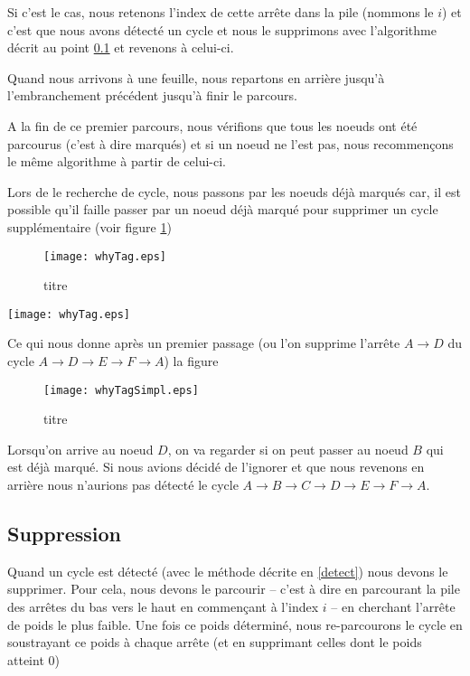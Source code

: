 \documentclass[12pt, oneside]{article}
\begin{document}
Si c'est le cas, nous retenons l'index de cette arrête dans la pile (nommons le $i$) et c'est que nous avons détecté un cycle et nous le supprimons avec l'algorithme décrit au point \ref{del} et revenons à celui-ci.

Quand nous arrivons à une feuille, nous repartons en arrière jusqu'à l'embranchement précédent jusqu'à finir le parcours.

A la fin de ce premier parcours, nous vérifions que tous les noeuds ont été parcourus (c'est à dire marqués) et si un noeud ne l'est pas, nous recommençons le même algorithme à partir de celui-ci.

Lors de le recherche de cycle, nous passons par les noeuds déjà marqués car, il est possible qu'il faille passer par un noeud déjà marqué pour supprimer un cycle supplémentaire (voir figure \ref{whyTag})

\begin{figure}[h]
   \caption{\label{whyTag} titre}
   \begin{center}
   \texttt{[image: whyTag.eps]}
   \end{center}
\end{figure}
\texttt{[image: whyTag.eps]}

Ce qui nous donne après un premier passage (ou l'on supprime l'arrête $A \rightarrow D$ du cycle $A \rightarrow D \rightarrow E \rightarrow F \rightarrow A$) la figure %
\begin{figure}[h]
   \caption{\label{whyTagSimpl} titre}
   \texttt{[image: whyTagSimpl.eps]}
\end{figure}
Lorsqu'on arrive au noeud $D$, on va regarder si on peut passer au noeud $B$ qui est déjà marqué. Si nous avions décidé de l'ignorer et que nous revenons en arrière nous n'aurions pas détecté le cycle $A \rightarrow B \rightarrow C \rightarrow D \rightarrow E \rightarrow F \rightarrow A$.

\subsection{Suppression}
\label{del}

Quand un cycle est détecté (avec le méthode décrite en \ref{detect}) nous devons le supprimer. Pour cela, nous devons le parcourir -- c'est à dire en parcourant la pile des arrêtes du bas vers le haut en commençant à l'index $i$ -- en cherchant l'arrête de poids le plus faible. Une fois ce poids déterminé, nous re-parcourons le cycle en soustrayant ce poids à chaque arrête (et en supprimant celles dont le poids atteint 0)
\end{document}
